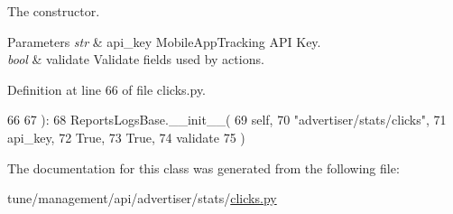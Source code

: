 The constructor. 


\begin{DoxyParams}{Parameters}
{\em str} & api\-\_\-key Mobile\-App\-Tracking A\-P\-I Key. \\
\hline
{\em bool} & validate Validate fields used by actions. \\
\hline
\end{DoxyParams}


Definition at line 66 of file clicks.\-py.


\begin{DoxyCode}
66 
67         ):
68         ReportsLogsBase.\_\_init\_\_(
69             self,
70             \textcolor{stringliteral}{"advertiser/stats/clicks"},
71             api\_key,
72             \textcolor{keyword}{True},
73             \textcolor{keyword}{True},
74             validate
75         )
\end{DoxyCode}


The documentation for this class was generated from the following file\-:\begin{DoxyCompactItemize}
\item 
tune/management/api/advertiser/stats/\hyperlink{clicks_8py}{clicks.\-py}\end{DoxyCompactItemize}
